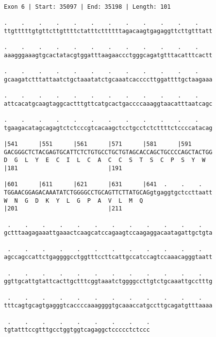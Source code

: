 \documentclass{article}
\begin{document}
\begin{Verbatim}[fontfamily=courier]
Exon 6 | Start: 35097 | End: 35198 | Length: 101

.    .    .    .    .    .    .    .    .    .    .    .    
ttgtttttgtgttcttgttttctatttcttttttagacaagtgagaggttcttgtttatt

.    .    .    .    .    .    .    .    .    .    .    .    
aaagggaaagtgcactatacgtggatttaagaaccctgggcagatgtttacatttcactt

.    .    .    .    .    .    .    .    .    .    .    .    
gcaagatctttattaatctgctaaatatctgcaaatcaccccttggattttgctaagaaa

.    .    .    .    .    .    .    .    .    .    .    .    
attcacatgcaagtaggcactttgttcatgcactgaccccaaaggtaacatttaatcagc

.    .    .    .    .    .    .    .    .    .    .    .    
tgaagacatagcagagtctctcccgtcacaagctcctgcctctcttttctccccatacag

|541      |551      |561      |571      |581      |591      
GACGGGCTCTACGAGTGCATTCTCTGTGCCTGCTGTAGCACCAGCTGCCCCAGCTACTGG
D  G  L  Y  E  C  I  L  C  A  C  C  S  T  S  C  P  S  Y  W  
|181                          |191                          

|601      |611      |621      |631      |641  .    .    .   
TGGAACGGAGACAAATATCTGGGGCCTGCAGTTCTTATGCAGgtgaggtgctccttaatt
W  N  G  D  K  Y  L  G  P  A  V  L  M  Q                    
|201                          |211                          

 .    .    .    .    .    .    .    .    .    .    .    .   
gctttaagagaaattgaaactcaagcatccagaagtccaagaggacaatagattgctgta

 .    .    .    .    .    .    .    .    .    .    .    .   
agccagccattctgaggggcctggtttccttcattgccatccagtccaaacagggtaatt

 .    .    .    .    .    .    .    .    .    .    .    .   
ggttgcattgtattcacttgctttcggtaaatctggggccttgtctgcaaattgcctttg

 .    .    .    .    .    .    .    .    .    .    .    .   
tttcagtgcagtgagggtcaccccaaaggggtgcaaaccatgccttgcagatgtttaaaa

 .    .    .    .    .    .    .    .    .
tgtatttccgtttgcctggtggtcagaggctccccctctccc
\end{Verbatim}
\newpage
\end{document}
